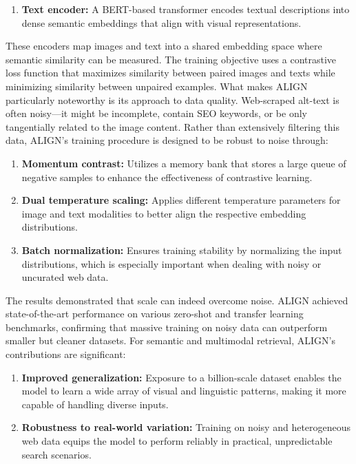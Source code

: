 \documentclass[conference]{IEEEtran}
\begin{document}
\begin{enumerate}
\begin{enumerate}
    \item \textbf{Text encoder:} A BERT-based transformer encodes textual descriptions into dense semantic embeddings that align with visual representations.
\end{enumerate}

These encoders map images and text into a shared embedding space where semantic similarity can be measured. The training objective uses a contrastive loss function that maximizes similarity between paired images and texts while minimizing similarity between unpaired examples.
What makes ALIGN particularly noteworthy is its approach to data quality. Web-scraped alt-text is often noisy—it might be incomplete, contain SEO keywords, or be only tangentially related to the image content. Rather than extensively filtering this data, ALIGN's training procedure is designed to be robust to noise through:

\begin{enumerate}
    \item \textbf{Momentum contrast:} Utilizes a memory bank that stores a large queue of negative samples to enhance the effectiveness of contrastive learning.
    
    \item \textbf{Dual temperature scaling:} Applies different temperature parameters for image and text modalities to better align the respective embedding distributions.
    
    \item \textbf{Batch normalization:} Ensures training stability by normalizing the input distributions, which is especially important when dealing with noisy or uncurated web data.
\end{enumerate}

The results demonstrated that scale can indeed overcome noise. ALIGN achieved state-of-the-art performance on various zero-shot and transfer learning benchmarks, confirming that massive training on noisy data can outperform smaller but cleaner datasets.
For semantic and multimodal retrieval, ALIGN's contributions are significant:

\begin{enumerate}
    \item \textbf{Improved generalization:} Exposure to a billion-scale dataset enables the model to learn a wide array of visual and linguistic patterns, making it more capable of handling diverse inputs.
    
    \item \textbf{Robustness to real-world variation:} Training on noisy and heterogeneous web data equips the model to perform reliably in practical, unpredictable search scenarios.
    

\end{enumerate}
\end{enumerate}
\end{document}

